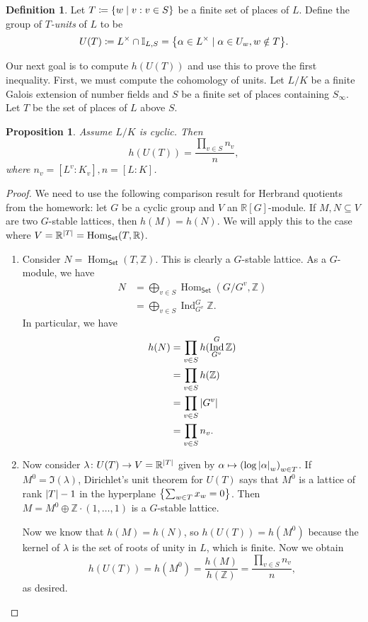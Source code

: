 \documentclass[leqno, openany]{memoir}
\newtheorem{prop}[thm]{Proposition}
\theoremstyle{definition}
\newtheorem{defn}[thm]{Definition}
\theoremstyle{remark}
\theoremstyle{plain}
\theoremstyle{definition}
\theoremstyle{remark}
\newcommand{\R}{\mathbb{R}}
\newcommand{\Z}{\mathbb{Z}}
\newcommand{\I}{\mathbb{I}}
\newcommand{\ms}[1]{\mathsf{#1}}
\DeclareMathOperator{\Hom}{Hom}
\DeclareMathOperator{\Ind}{Ind}
\begin{document}
\begin{defn}
    Let $T \coloneqq \qty{w \mid v : v \in S}$ be a finite set of places of $L$. Define the group of \textit{$T$-units} of $L$ to be
    \[ U(T) \coloneqq L^{\times} \cap \I_{L, S} = \qty{\alpha \in L^{\times} \mid \alpha \in U_w, w \notin T}. \]
\end{defn}

Our next goal is to compute $h(U(T))$ and use this to prove the first inequality. First, we must compute the cohomology of units. Let $L/K$ be a finite Galois extension of number fields and $S$ be a finite set of places containing $S_{\infty}$. Let $T$ be the set of places of $L$ above $S$.

\begin{prop}
    Assume $L/K$ is cyclic. Then 
    \[ h(U(T)) = \frac{\prod_{v \in S} n_v}{n}, \] 
    where $n_v = [L^v:K_v], n=[L:K]$.
\end{prop}

\begin{proof}
    We need to use the following comparison result for Herbrand quotients from the homework: let $G$ be a cyclic group and $V$ an $\R[G]$-module. If $M, N \subseteq V$ are two $G$-stable lattices, then $h(M) = h(N)$. We will apply this to the case where $V = \R^{\abs{T}} = \Hom_{\ms{Set}}(T, \R)$.
    \begin{enumerate}
        \item Consider $N = \Hom_{\ms{Set}}(T, \Z)$. This is clearly a $G$-stable lattice. As a $G$-module, we have
            \begin{align*}
                N &= \bigoplus_{v \in S} \Hom_{\ms{Set}}(G/G^v, \Z) \\
                  &= \bigoplus_{v \in S} \Ind_{G^v}^G \Z.
            \end{align*}
            In particular, we have
            \begin{align*}
                h(N) &= \prod_{v \in S} h(\Ind_{G^v}^G \Z) \\ 
                     &= \prod_{v \in S} h(\Z) \\
                     &= \prod_{v \in S} \abs{G^v} \\
                     &= \prod_{v \in S} n_v. 
            \end{align*}
        \item Now consider $\lambda \colon U(T) \to V = \R^{\abs{T}}$ given by $\alpha \mapsto {(\log \abs{\alpha}_w)}_{w \in T}$. If $M^0 = \Im(\lambda)$, Dirichlet's unit theorem for $U(T)$ says that $M^0$ is a lattice of rank $\abs{T} - 1$ in the hyperplane $\qty{\sum_{w \in T} x_w = 0}$. Then $M = M^0 \oplus \Z \cdot (1, \ldots, 1)$ is a $G$-stable lattice.

            Now we know that $h(M) = h(N)$, so $h(U(T)) = h(M^0)$ because the kernel of $\lambda$ is the set of roots of unity in $L$, which is finite. Now we obtain
            \[ h(U(T)) = h(M^0) = \frac{h(M)}{h(\Z)} = \frac{\prod_{v \in S} n_v}{n}, \]
            as desired. \qedhere
    \end{enumerate}
\end{proof}
\end{document}
